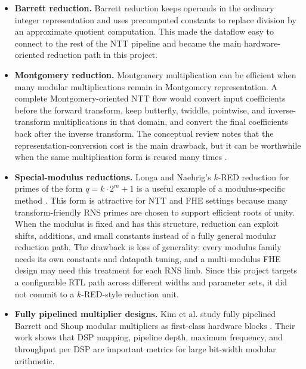 \documentclass[a4paper, 12pt, titlepage]{article}
\begin{document}
\begin{itemize}
    \item \textbf{Barrett reduction.} Barrett reduction keeps operands in the
    ordinary integer representation and uses precomputed constants to replace
    division by an approximate quotient computation. This made the dataflow easy
    to connect to the rest of the NTT pipeline and became the main
    hardware-oriented reduction path in this project.

    \item \textbf{Montgomery reduction.} Montgomery multiplication can be
    efficient when many modular multiplications remain in Montgomery
    representation. A complete Montgomery-oriented NTT flow would convert input
    coefficients before the forward transform, keep butterfly, twiddle,
    pointwise, and inverse-transform multiplications in that domain, and convert
    the final coefficients back after the inverse transform. The conceptual
    review notes that the representation-conversion cost is the main drawback,
    but it can be worthwhile when the same multiplication form is reused many
    times \cite{conceptual-review}.

    \item \textbf{Special-modulus reductions.} Longa and Naehrig's \(k\)-RED reduction for primes of the form \(q = k \cdot 2^m + 1\) is a useful example of a modulus-specific method \cite{k-red}. This form is attractive for NTT and FHE settings because many transform-friendly RNS primes are chosen to support efficient roots of unity. When the modulus is fixed and has this structure, reduction can exploit shifts, additions, and small constants instead of a fully general modular reduction path. The drawback is loss of generality: every modulus family needs its own constants and datapath tuning, and a multi-modulus FHE design may need this treatment for each RNS limb. Since this project targets a configurable RTL path across different widths and parameter sets, it did not commit to a \(k\)-RED-style reduction unit.

    \item \textbf{Fully pipelined multiplier designs.} Kim et al. study fully
    pipelined Barrett and Shoup modular multipliers as first-class hardware
    blocks \cite{kim-modmult}. Their work shows that DSP mapping, pipeline
    depth, maximum frequency, and throughput per DSP are important metrics for
    large bit-width modular arithmetic.
\end{itemize}
\end{document}
